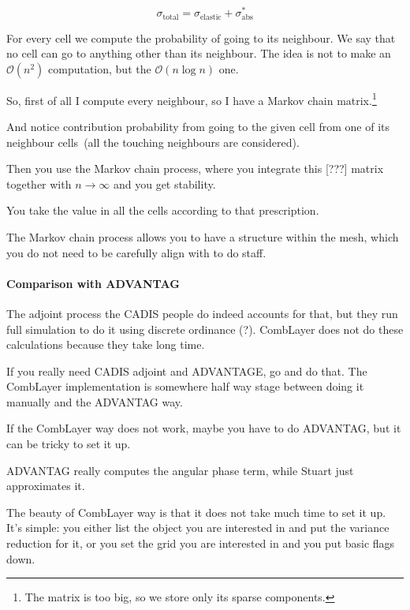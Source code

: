 $$
\sigma_\text{total} = \sigma_\text{elastic} + \sigma_\text{abs}^*
$$

For every cell we compute the probability of going to its neighbour. We say that no cell can go to anything other than its neighbour.
The idea is not to make an $\mathcal{O}(n^2)$ computation, but the $\mathcal{O}(n\log{}n)$ one.

So, first of all I compute every neighbour, so I have a Markov chain matrix.\footnote{The matrix is too big, so we store only its sparse components.} %

And notice contribution probability from going to the given cell from one of its neighbour cells~(all the touching neighbours are considered).

Then you use the Markov chain process, where you integrate this [\alert{???}] matrix together with $n\to\infty$ and you get stability.

You take the value in all the cells according to that prescription.


The Markov chain process allows you to have a structure within the mesh, which you do not need to be carefully align with to do staff.

\paragraph{Comparison with ADVANTAG}

The adjoint process the CADIS people do indeed accounts for that, but they run full simulation to do it using discrete ordinance (?).
CombLayer does not do these calculations because they take long time.

If you really need CADIS adjoint and ADVANTAGE, go and do that.
The CombLayer implementation is somewhere half way stage between doing it manually and the ADVANTAG way.


If the CombLayer way does not work, maybe you have to do ADVANTAG, but it can be tricky to set it up.

ADVANTAG really computes the angular phase term, while Stuart just approximates it.

The beauty of CombLayer way is that it does not take much time to set it up. It's simple: you either list the object you are interested in and put the variance reduction for it,
or you set the grid you are interested in and you put basic flags down.

